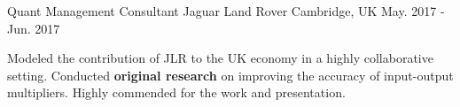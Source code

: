 \begin{cventries}
  \cventry
    {Quant Management Consultant} %
    {Jaguar Land Rover} %
    {Cambridge, UK} %
    {May. 2017 - Jun. 2017} %
    {
      \begin{cvitems} %
        \item {Modeled the contribution of JLR to the UK economy in a highly collaborative setting. Conducted \textbf{original research} on improving the accuracy of input-output multipliers. Highly commended for the work and presentation.}
      \end{cvitems}
    }

\end{cventries}
